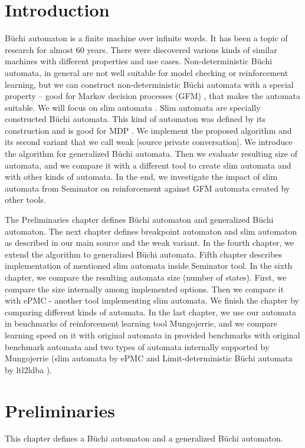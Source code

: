 \documentclass[
	digital,
nolof, nolot
]{fithesis3}
\begin{document}
	\chapter{Introduction}
	Büchi automaton is a finite machine over infinite words. It has been a topic of research for almost 60 years.
	There were discovered various kinds of similar machines with different properties and use cases.
	Non-deterministic Büchi automata, in general are not well suitable for model checking or reinforcement learning, but we can construct non-deterministic Büchi automata with a special property -- good for Markov decision processes (GFM)  \cite{hlavni}, that makes the automata suitable. We will focus on slim automata \cite{hlavni}.
	Slim automata are specially constructed Büchi automata. This kind of automaton was defined by its construction and is good for MDP \cite{hlavni}. We implement the proposed algorithm and its second variant that we call weak [source private conversation]. We introduce the algorithm for generalized Büchi automata. Then we evaluate resulting size of automata, and we compare it with a different tool to create slim automata and with other kinds of automata. In the end, we investigate the impact of slim automata from Seminator on reinforcement against GFM automata created by other tools.
	
	The Preliminaries chapter defines Büchi automaton and generalized Büchi automaton.
	The next chapter defines breakpoint automaton and slim automaton as described in our main source \cite{hlavni} and the weak variant.
	In the fourth chapter, we extend the algorithm to generalized Büchi automata.
	Fifth chapter describes implementation of mentioned slim automata inside Seminator \cite{Klokočka2017thesis}\cite{seminator}\cite{seminator2} tool.
	In the sixth chapter, we compare the resulting automata size (number of states). First, we compare the size internally among implemented options. Then we compare it with ePMC \cite{epmc} - another tool implementing slim automata. We finish the chapter by comparing different kinds of automata.
	In the last chapter, we use our automata in benchmarks of reinforcement learning tool Mungojerrie\cite{mungojerrie}, and we compare learning speed on it with original automata in provided benchmarks with original benchmark automata and two types of automata internally supported by Mungojerrie (slim automata by ePMC and Limit-deterministic Büchi automata by ltl2ldba \cite{ltl2ldba}).
	
	

	\chapter{Preliminaries}
		This chapter defines a Büchi automaton and a generalized Büchi automaton. 
		
\end{document}
